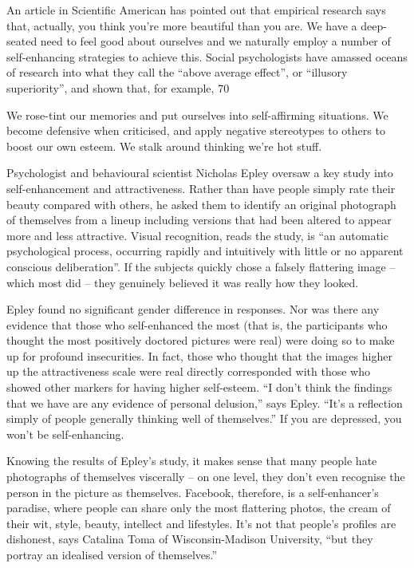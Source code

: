 An article in Scientific American has pointed out that empirical research says that, actually, you think you're more beautiful than you are. We have a deep-seated need to feel good about ourselves and we naturally employ a number of self-enhancing strategies to achieve this. Social psychologists have amassed oceans of research into what they call the ``above average effect'', or ``illusory superiority'', and shown that, for example, 70%


We rose-tint our memories and put ourselves into self-affirming situations. We become defensive when criticised, and apply negative stereotypes to others to boost our own esteem. We stalk around thinking we're hot stuff.


Psychologist and behavioural scientist Nicholas Epley oversaw a key study into self-enhancement and attractiveness. Rather than have people simply rate their beauty compared with others, he asked them to identify an original photograph of themselves from a lineup including versions that had been altered to appear more and less attractive. Visual recognition, reads the study, is ``an automatic psychological process, occurring rapidly and intuitively with little or no apparent conscious deliberation''. If the subjects quickly chose a falsely flattering image – which most did – they genuinely believed it was really how they looked.


Epley found no significant gender difference in responses. Nor was there any evidence that those who self-enhanced the most (that is, the participants who thought the most positively doctored pictures were real) were doing so to make up for profound insecurities. In fact, those who thought that the images higher up the attractiveness scale were real directly corresponded with those who showed other markers for having higher self-esteem. ``I don't think the findings that we have are any evidence of personal delusion,'' says Epley. ``It's a reflection simply of people generally thinking well of themselves.'' If you are depressed, you won't be self-enhancing.


Knowing the results of Epley's study, it makes sense that many people hate photographs of themselves viscerally – on one level, they don't even recognise the person in the picture as themselves. Facebook, therefore, is a self-enhancer's paradise, where people can share only the most flattering photos, the cream of their wit, style, beauty, intellect and lifestyles. It's not that people's profiles are dishonest, says Catalina Toma of Wisconsin-Madison University, ``but they portray an idealised version of themselves.''